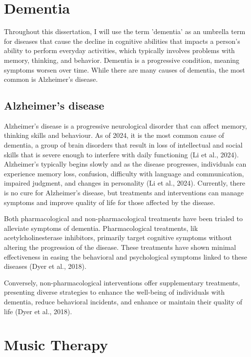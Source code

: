 \documentclass{l4proj}
\begin{document}
\section{Dementia}

Throughout this dissertation, I will use the term 'dementia' as an umbrella term for diseases that cause the decline in cognitive abilities that impacts a person's ability to perform everyday activities, which typically involves problems with memory, thinking, and behavior.  Dementia is a progressive condition, meaning symptoms worsen over time. While there are many causes of dementia, the most common is Alzheimer's disease.

\subsection{Alzheimer's disease}
Alzheimer's disease is a progressive neurological disorder that can affect memory, thinking skills and behaviour. As of 2024, it is the most common cause of dementia, a group of brain disorders that result in loss of intellectual and social skills that is severe enough to interfere with daily functioning (Li et al., 2024). Alzheimer's typically begins slowly and as the disease progresses, individuals can experience memory loss, confusion, difficulty with language and communication, impaired judgment, and changes in personality (Li et al., 2024). Currently, there is no cure for Alzheimer's disease, but treatments and interventions can manage symptoms and improve quality of life for those affected by the disease.

Both pharmacological and non-pharmacological treatments have been trialed to alleviate symptoms of dementia. Pharmacological treatments, lik acetylcholinesterase inhibitors, primarily target cognitive symptoms without altering the progression of the disease. These treatments have shown minimal effectiveness in easing the behavioral and psychological symptoms linked to these diseases (Dyer et al., 2018).

Conversely, non-pharmacological interventions offer supplementary treatments, presenting diverse strategies to enhance the well-being of individuals with dementia, reduce behavioral incidents, and enhance or maintain their quality of life (Dyer et al., 2018).

\section{Music Therapy}\label{sec:music_therapy}
\end{document}
